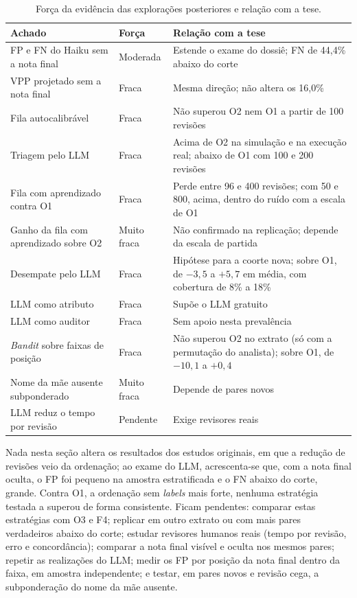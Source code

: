 \begin{table}[!ht]
\centering
\footnotesize
\caption{Força da evidência das explorações posteriores e relação com a tese.}
\label{tab:ap-filas-evidencia}
\begin{tabular}{>{\raggedright\arraybackslash}p{5.2cm}>{\raggedright\arraybackslash}p{2.2cm}>{\raggedright\arraybackslash}p{5.2cm}}
\toprule
Achado & Força & Relação com a tese \\
\midrule
FP e FN do Haiku sem a nota final & Moderada & Estende o exame do dossiê; FN de 44,4\% abaixo do corte \\
VPP projetado sem a nota final & Fraca & Mesma direção; não altera os 16,0\% \\
Fila autocalibrável & Fraca & Não superou O2 nem O1 a partir de 100 revisões \\
Triagem pelo LLM & Fraca & Acima de O2 na simulação e na execução real; abaixo de O1 com 100 e 200 revisões \\
Fila com aprendizado contra O1 & Fraca & Perde entre 96 e 400 revisões; com 50 e 800, acima, dentro do ruído com a escala de O1 \\
Ganho da fila com aprendizado sobre O2 & Muito fraca & Não confirmado na replicação; depende da escala de partida \\
Desempate pelo LLM & Fraca & Hipótese para a coorte nova; sobre O1, de $-3{,}5$ a $+5{,}7$ em média, com cobertura de 8\% a 18\% \\
LLM como atributo & Fraca & Supõe o LLM gratuito \\
LLM como auditor & Fraca & Sem apoio nesta prevalência \\
\textit{Bandit} sobre faixas de posição & Fraca & Não superou O2 no extrato (só com a permutação do analista); sobre O1, de $-10{,}1$ a $+0{,}4$ \\
Nome da mãe ausente subponderado & Muito fraca & Depende de pares novos \\
LLM reduz o tempo por revisão & Pendente & Exige revisores reais \\
\bottomrule
\end{tabular}
\end{table}

Nada nesta seção altera os resultados dos estudos originais, em que a redução de revisões veio da ordenação; ao exame do LLM, acrescenta-se que, com a nota final oculta, o FP foi pequeno na amostra estratificada e o FN abaixo do corte, grande. Contra O1, a ordenação sem \textit{labels} mais forte, nenhuma estratégia testada a superou de forma consistente. Ficam pendentes: comparar estas estratégias com O3 e F4; replicar em outro extrato ou com mais pares verdadeiros abaixo do corte; estudar revisores humanos reais (tempo por revisão, erro e concordância); comparar a nota final visível e oculta nos mesmos pares; repetir as realizações do LLM; medir os FP por posição da nota final dentro da faixa, em amostra independente; e testar, em pares novos e revisão cega, a subponderação do nome da mãe ausente.

